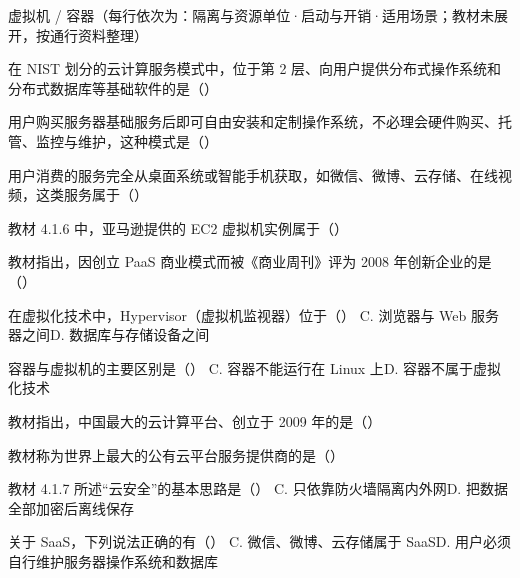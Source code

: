 \documentclass[a4paper,11pt]{article}
\begin{document}
\begin{contrast}{虚拟机 / 容器（每行依次为：隔离与资源单位·启动与开销·适用场景；教材未展开，按通行资料整理）}
\end{contrast}

\q 在 NIST 划分的云计算服务模式中，位于第 2 层、向用户提供分布式操作系统和分布式数据库等基础软件的是（\quad）

\q 用户购买服务器基础服务后即可自由安装和定制操作系统，不必理会硬件购买、托管、监控与维护，这种模式是（\quad）

\q 用户消费的服务完全从桌面系统或智能手机获取，如微信、微博、云存储、在线视频，这类服务属于（\quad）

\q 教材 4.1.6 中，亚马逊提供的 EC2 虚拟机实例属于（\quad）

\q 教材指出，因创立 PaaS 商业模式而被《商业周刊》评为 2008 年创新企业的是（\quad）

\q 在虚拟化技术中，Hypervisor（虚拟机监视器）位于（\quad）
{C. 浏览器与 Web 服务器之间}{D. 数据库与存储设备之间}

\q 容器与虚拟机的主要区别是（\quad）
{C. 容器不能运行在 Linux 上}{D. 容器不属于虚拟化技术}

\q 教材指出，中国最大的云计算平台、创立于 2009 年的是（\quad）

\q 教材称为世界上最大的公有云平台服务提供商的是（\quad）

\q 教材 4.1.7 所述“云安全”的基本思路是（\quad）
{C. 只依靠防火墙隔离内外网}{D. 把数据全部加密后离线保存}

\q 关于 SaaS，下列说法正确的有（\quad）
{C. 微信、微博、云存储属于 SaaS}{D. 用户必须自行维护服务器操作系统和数据库}
\end{document}
